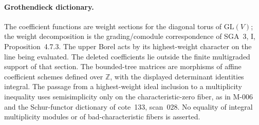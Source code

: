 \paragraph{Grothendieck dictionary.}
The coefficient functions are weight sections for the diagonal torus
of \(\mathrm{GL}(V)\); the weight decomposition is the grading/comodule
correspondence of SGA~3, I, Proposition~4.7.3. The upper Borel
acts by its highest-weight character on the line being evaluated.
The deleted coefficients lie outside the finite multigraded support
of that section. The bounded-tree matrices are morphisms of affine
coefficient schemes defined over \(\mathbb Z\), with the displayed
determinant identities integral. The passage from a highest-weight
ideal inclusion to a multiplicity inequality uses semisimplicity
only on the characteristic-zero fiber, as in M-006 and the
Schur-functor dictionary of cote~133, scan~028. No equality of
integral multiplicity modules or of bad-characteristic fibers
is asserted.

